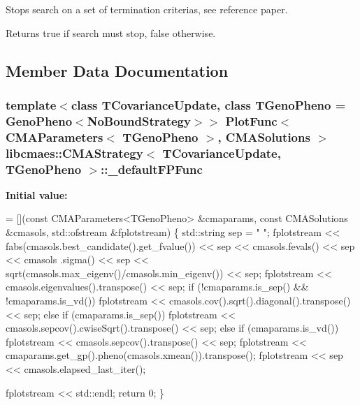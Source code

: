Stops search on a set of termination criterias, see reference paper. 

\begin{DoxyReturn}{Returns}
true if search must stop, false otherwise. 
\end{DoxyReturn}


\subsection{Member Data Documentation}
\hypertarget{classlibcmaes_1_1CMAStrategy_a0fcdccd9451a2dc509ee651f664ac31f}{
\subsubsection[{\-\_\-default\-F\-P\-Func}]{\setlength{\rightskip}{0pt plus 5cm}template$<$class T\-Covariance\-Update, class T\-Geno\-Pheno = Geno\-Pheno$<$\-No\-Bound\-Strategy$>$$>$ Plot\-Func$<$ {\bf C\-M\-A\-Parameters}$<$ T\-Geno\-Pheno $>$, {\bf C\-M\-A\-Solutions} $>$ {\bf libcmaes\-::\-C\-M\-A\-Strategy}$<$ T\-Covariance\-Update, T\-Geno\-Pheno $>$\-::\-\_\-default\-F\-P\-Func\hspace{0.3cm}{\ttfamily [static]}}}\label{classlibcmaes_1_1CMAStrategy_a0fcdccd9451a2dc509ee651f664ac31f}
{\bfseries Initial value\-:}
\begin{DoxyCode}
= [](\textcolor{keyword}{const} CMAParameters<TGenoPheno> &cmaparams, \textcolor{keyword}{const} CMASolutions &cmasols, std::ofstream &fplotstream)
  \{
    std::string sep = \textcolor{stringliteral}{" "};
    fplotstream << fabs(cmasols.best\_candidate().get\_fvalue()) << sep << cmasols.fevals() << sep << cmasols
      .sigma() << sep << sqrt(cmasols.max\_eigenv()/cmasols.min\_eigenv()) << sep;
    fplotstream << cmasols.eigenvalues().transpose() << sep;
    \textcolor{keywordflow}{if} (!cmaparams.is\_sep() && !cmaparams.is\_vd())
      fplotstream << cmasols.cov().sqrt().diagonal().transpose() << sep; 
    \textcolor{keywordflow}{else} \textcolor{keywordflow}{if} (cmaparams.is\_sep())
      fplotstream << cmasols.sepcov().cwiseSqrt().transpose() << sep;
    \textcolor{keywordflow}{else} \textcolor{keywordflow}{if} (cmaparams.is\_vd())
      fplotstream << cmasols.sepcov().transpose() << sep; 
    fplotstream << cmaparams.get\_gp().pheno(cmasols.xmean()).transpose();
    fplotstream << sep << cmasols.elapsed\_last\_iter();



    fplotstream << std::endl;
    \textcolor{keywordflow}{return} 0;
  \}
\end{DoxyCode}
